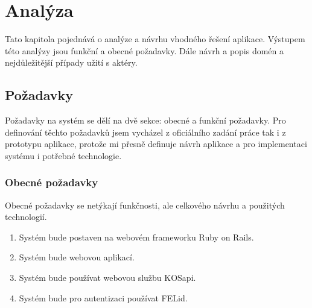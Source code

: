 \chapter{Analýza}
Tato kapitola pojednává o analýze a návrhu vhodného řešení aplikace. Výstupem této analýzy jsou funkční a obecné požadavky. Dále návrh a popis domén a nejdůležitější případy užití s aktéry. 

\section{Požadavky}
Požadavky na systém se dělí na dvě sekce: obecné a funkční požadavky. Pro definování těchto požadavků jsem vycházel z oficiálního zadání práce tak i z prototypu aplikace, protože mi přesně definuje návrh aplikace a pro implementaci systému i potřebné technologie.

\subsection{Obecné požadavky}
Obecné požadavky se netýkají funkčnosti, ale celkového návrhu a použitých technologií.
\begin{enumerate}
\item Systém bude postaven na webovém frameworku Ruby on Rails.
\item Systém bude webovou aplikací.
\item Systém bude používat webovou službu KOSapi.
\item Systém bude pro autentizaci používat FELid.
\end{enumerate}

